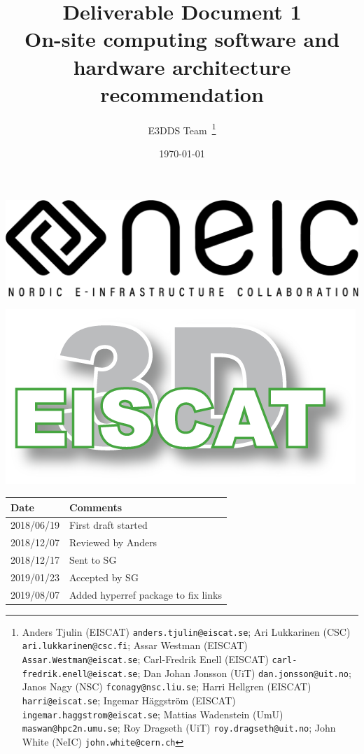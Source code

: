 \documentclass[12pt,a4paper]{article}
\title{
{\bf Deliverable Document 1} \\
On-site computing software and hardware architecture
recommendation}
\author{E3DDS Team~\footnote{
Anders Tjulin (EISCAT) {\tt anders.tjulin@eiscat.se};
Ari Lukkarinen (CSC) {\tt ari.lukkarinen@csc.fi};
Assar Westman (EISCAT) {\tt Assar.Westman@eiscat.se};
Carl-Fredrik Enell (EISCAT) {\tt carl-fredrik.enell@eiscat.se};
Dan Johan Jonsson (UiT) {\tt dan.jonsson@uit.no};
Janos Nagy (NSC) {\tt fconagy@nsc.liu.se};
Harri Hellgren (EISCAT) {\tt harri@eiscat.se};
Ingemar H\"{a}ggstr\"{o}m (EISCAT) {\tt ingemar.haggstrom@eiscat.se};
Mattias Wadenstein (UmU) {\tt maswan@hpc2n.umu.se};
Roy Dragseth (UiT) {\tt roy.dragseth@uit.no};
John White (NeIC) {\tt john.white@cern.ch}}}
\date{\today}
\begin{document}
\pagestyle{fancy}

\maketitle
\par\noindent
\begin{minipage}{0.45\textwidth}
  \includegraphics[scale=0.18]{NEIC_logo_screen_black.pdf}
\end{minipage}
\begin{minipage}{0.45\textwidth}
  \hfill
  \includegraphics[width=0.75\linewidth]{e3d-logo-green-500px}
\end{minipage}

\begin{center}
\begin{tabular}{|l|l|} \hline
\large \bf Date & \large \bf Comments \\ \hline
\large 2018/06/19 & First draft started \\ \hline
\large 2018/12/07 & Reviewed by Anders \\ \hline
\large 2018/12/17 & Sent to SG \\ \hline
\large 2019/01/23 & Accepted by SG \\ \hline
\large 2019/08/07 & Added hyperref package to fix links\\ \hline

\end{tabular}
\end{center}
\end{document}

